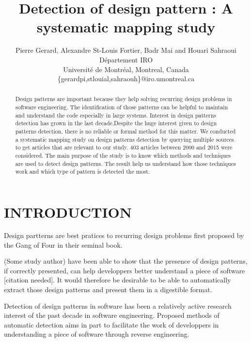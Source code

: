 \documentclass[letterpaper, 10 pt, conference]{ieeeconf}  %
\title{\LARGE \bf
Detection of design pattern : A systematic mapping study}
\author{Pierre Gerard, Alexandre St-Louis Fortier, Badr Mai and Houari Sahraoui \\
Département IRO \\
Université de Montréal, Montreal, Canada \\
\{gerardpi,stlouial,sahraouh\}@iro.umontreal.ca
}
\begin{document}
\maketitle
\thispagestyle{empty}
\pagestyle{empty}


\begin{abstract}

Design patterns are important because they help solving recurring design problems in software engineering. The identification of those patterns can be helpful to maintain and understand the code especially in large systems. Interest in design patterns detection has grown in the last decade.Despite the huge interest given to design patterns detection, there is no reliable or formal method for this matter.
We conducted a systematic mapping study on design patterns detection by querying multiple sources to get articles that are relevant to our study. 403 articles between 2000 and 2015 were considered.
The main purpose of the study is to know which methods and techniques are used to detect design patterns.
The result help us understand how those techniques work and which type of pattern is detected the most.



\end{abstract}


\section{INTRODUCTION}


Design partterns are best pratices to recurring design problems first proposed
by the Gang of Four in their seminal book.

(Some study author) have been able to show that the presence of design patterns,
if correctly presented, can help developpers better understand a piece of
software [citation needed].
It would therefore be desirable to be able to automatically extract those
design patterns and present them in a digestible format.

Detection of design patterns in software has been a relatively active research
interest of the past decade in software engineering.
Proposed methods of automatic detection aims in part to facilitate the work of
developpers in understanding a piece of software through reverse engineering.
\end{document}
